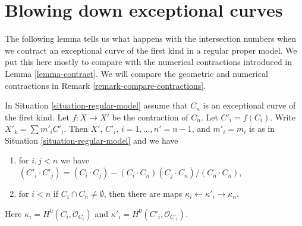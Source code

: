 \section{Blowing down exceptional curves}
\label{section-contract}

\noindent
The following lemma tells us what happens with the intersection
numbers when we contract an exceptional curve of the first kind
in a regular proper model. We put this here mostly to compare with
the numerical contractions introduced in Lemma \ref{lemma-contract}.
We will compare the geometric and numerical contractions in
Remark \ref{remark-compare-contractions}.

\begin{lemma}
\label{lemma-blowdown-regular-model}
In Situation \ref{situation-regular-model} assume that $C_n$ is
an exceptional curve of the first kind. Let $f : X \to X'$ be the
contraction of $C_n$. Let $C'_i = f(C_i)$. Write $X'_k = \sum m'_i C'_i$.
Then $X'$, $C'_i$, $i = 1, \ldots, n' = n - 1$, and $m'_i = m_i$
is as in Situation \ref{situation-regular-model} and we have
\begin{enumerate}
\item for $i, j < n$ we have
$(C'_i \cdot C'_j) =
(C_i \cdot C_j) - (C_i \cdot C_n) (C_j \cdot C_n) /(C_n \cdot C_n)$,
\item for $i < n$ if $C_i \cap C_n \not = \emptyset$, then there are
maps $\kappa_i \leftarrow \kappa'_i \rightarrow \kappa_n$.
\end{enumerate}
Here $\kappa_i = H^0(C_i, \mathcal{O}_{C_i})$ and
$\kappa'_i = H^0(C'_i, \mathcal{O}_{C'_i})$.
\end{lemma}


